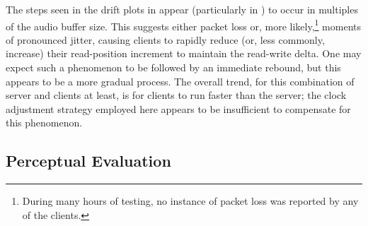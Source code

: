 The steps seen in the drift plots in
 appear (particularly in
) to occur in multiples of the audio buffer size.
This suggests either packet loss or, more likely,\footnote{
    During many hours of testing, no instance of packet loss was reported by any
    of the clients.
} moments of pronounced jitter, causing
clients to rapidly reduce (or, less commonly, increase) their read-position
increment to maintain the read-write delta.
One may expect such a phenomenon to be followed by an immediate rebound, but
this appears to be a more gradual process.
The overall trend, for this combination of server and clients at least, is for
clients to run faster than the server;
the clock adjustment strategy employed here appears to be insufficient to
compensate for this phenomenon.

\subsection{Perceptual Evaluation}\label{subsec:perceptual-evaluation}

